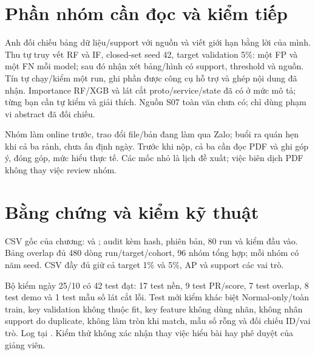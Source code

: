 

\section{Phần nhóm cần đọc và kiểm tiếp}
Anh đối chiếu bảng dữ liệu/support với nguồn và viết giới hạn bằng lời của mình. Thu tự truy vết RF và IF, closed-set seed 42, target validation 5\%: một FP và một FN mỗi model; sau đó nhận xét bảng/hình có support, threshold và nguồn. Tín tự chạy/kiểm một run, ghi phần được công cụ hỗ trợ và ghép nội dung đã nhận. Importance RF/XGB và lát cắt proto/service/state đã có ở mức mô tả; từng bạn cần tự kiểm và giải thích. Nguồn S07 toàn văn chưa có; chỉ dùng phạm vi abstract đã đối chiếu.

Nhóm làm online trước, trao đổi file/bản đang làm qua Zalo; buổi ra quán hẹn khi cả ba rảnh, chưa ấn định ngày. Trước khi nộp, cả ba cần đọc PDF và ghi góp ý, đóng góp, mức hiểu thực tế. Các mốc nhỏ là lịch đề xuất; việc biên dịch PDF không thay việc review nhóm.

\section{Bằng chứng và kiểm kỹ thuật}
CSV gốc của chương:  và ; audit kèm hash, phiên bản, 80 run và kiểm đầu vào. Bảng overlap đủ 480 dòng run/target/cohort, 96 nhóm tổng hợp; mỗi nhóm có năm seed. CSV đầy đủ giữ cả target 1\% và 5\%, AP và support các vai trò.

Bộ kiểm ngày 25/10 có 42 test đạt: 17 test nền, 9 test PR/score, 7 test overlap, 8 test demo và 1 test mẫu số lát cắt lỗi. Test mới kiểm khác biệt Normal-only/toàn train, key validation không thuộc fit, key feature không dùng nhãn, không nhân support do duplicate, không làm tròn khi match, mẫu số rỗng và đối chiếu ID/vai trò. Log tại . Kiểm thử không xác nhận thay việc hiểu bài hay phê duyệt của giảng viên.
